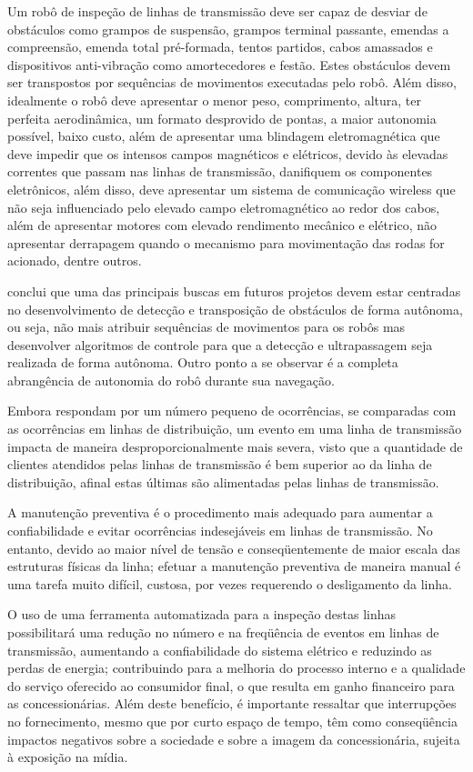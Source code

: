 Um robô de inspeção de linhas de transmissão deve ser capaz de desviar de obstáculos como grampos de suspensão, grampos terminal passante, emendas a compreensão, emenda total pré-formada, tentos partidos, cabos amassados e dispositivos anti-vibração como amortecedores e festão. Estes obstáculos devem ser transpostos por sequências de movimentos executadas pelo robô. Além disso, idealmente o robô deve apresentar o menor peso, comprimento, altura, ter perfeita aerodinâmica, um formato desprovido de pontas, a maior autonomia possível, baixo custo, além de apresentar uma blindagem eletromagnética que deve impedir que os intensos campos magnéticos e elétricos, devido às elevadas correntes que passam nas linhas de transmissão, danifiquem os componentes eletrônicos, além disso, deve apresentar um sistema de comunicação wireless que não seja influenciado pelo elevado campo eletromagnético ao redor dos cabos, além de apresentar motores com elevado rendimento mecânico e elétrico, não apresentar derrapagem quando o mecanismo para movimentação das rodas for acionado, dentre outros.

 conclui que uma das principais buscas em futuros projetos devem estar centradas no desenvolvimento de detecção e transposição de obstáculos de forma autônoma, ou seja, não mais atribuir sequências de movimentos para os robôs mas desenvolver algoritmos de controle para que a detecção e ultrapassagem seja realizada de forma autônoma. Outro ponto a se observar é a completa abrangência de autonomia do robô durante sua navegação. 
  
Embora respondam por um número pequeno de ocorrências, se comparadas com as ocorrências em linhas de distribuição, um evento em uma linha de transmissão impacta de maneira desproporcionalmente mais severa, visto que a quantidade de clientes atendidos pelas linhas de transmissão é bem superior ao da linha de distribuição, afinal estas últimas são alimentadas pelas linhas de transmissão.

A manutenção preventiva é o procedimento mais adequado para aumentar a confiabilidade e evitar ocorrências indesejáveis em linhas de transmissão. No entanto, devido ao maior nível de tensão e conseqüentemente de maior escala das estruturas físicas da linha; efetuar a manutenção preventiva de maneira manual é uma tarefa muito difícil, custosa, por vezes requerendo o desligamento da linha. 

O uso de uma ferramenta automatizada para a inspeção destas linhas possibilitará uma redução no número e na freqüência de eventos em linhas de transmissão, aumentando a confiabilidade do sistema elétrico e reduzindo as perdas de energia; contribuindo para a melhoria do processo interno e a qualidade do serviço oferecido ao consumidor final, o que resulta em ganho financeiro para as concessionárias. Além deste benefício, é importante ressaltar que interrupções no fornecimento, mesmo que por curto espaço de tempo, têm como conseqüência impactos negativos sobre a sociedade e sobre a imagem da concessionária, sujeita à exposição na mídia.

